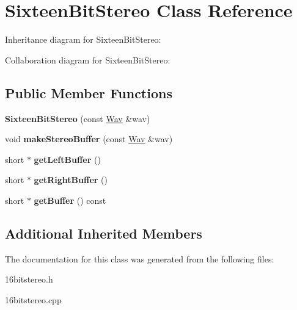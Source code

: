 \hypertarget{classSixteenBitStereo}{}\section{Sixteen\+Bit\+Stereo Class Reference}
\label{classSixteenBitStereo}


Inheritance diagram for Sixteen\+Bit\+Stereo\+:


Collaboration diagram for Sixteen\+Bit\+Stereo\+:
\subsection*{Public Member Functions}
\begin{DoxyCompactItemize}
\item 
\mbox{\label{classSixteenBitStereo_a13f3231e9e420e9a7acceaa300ee6c71}} 
{\bfseries Sixteen\+Bit\+Stereo} (const \hyperlink{classWav}{Wav} \&wav)
\item 
\mbox{\label{classSixteenBitStereo_ae3432aada39f3db75e6452a141eb8465}} 
void {\bfseries make\+Stereo\+Buffer} (const \hyperlink{classWav}{Wav} \&wav)
\item 
\mbox{\label{classSixteenBitStereo_a7f32d58142b5a0b0f2f3f6a3966d3123}} 
short $\ast$ {\bfseries get\+Left\+Buffer} ()
\item 
\mbox{\label{classSixteenBitStereo_a1650df261c08a181004fe08fdf116bde}} 
short $\ast$ {\bfseries get\+Right\+Buffer} ()
\item 
\mbox{\label{classSixteenBitStereo_a33d3535a8b8153adc232fac28d83b554}} 
short $\ast$ {\bfseries get\+Buffer} () const
\end{DoxyCompactItemize}
\subsection*{Additional Inherited Members}


The documentation for this class was generated from the following files\+:\begin{DoxyCompactItemize}
\item 
16bitstereo.\+h\item 
16bitstereo.\+cpp\end{DoxyCompactItemize}
